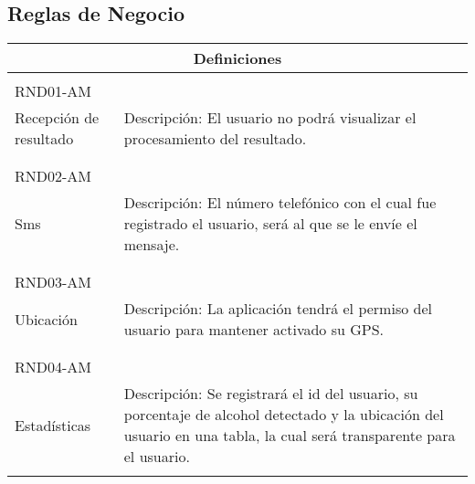 \subsection{Reglas de Negocio} 
  \begin{center}
   \begin{tabular}[b]{| p{5.5cm} | p{7cm} |}
     \hline
     \multicolumn{2}{|c|}{Definiciones} \\ \hline
    \\ RND01-AM \\ Recepción de resultado & Descripción: El usuario no podrá visualizar el procesamiento del resultado. \\ \\ \hline
    \\ RND02-AM \\ Sms & Descripción: El número telefónico con el cual fue registrado el usuario, será al que se le envíe el mensaje. \\ \\ \hline
    \\ RND03-AM \\ Ubicación & Descripción: La aplicación tendrá el permiso del usuario para mantener activado su GPS. \\ \\ \hline
    \\ RND04-AM \\ Estadísticas & Descripción: Se registrará el id del usuario, su porcentaje de alcohol detectado y la ubicación del usuario en una tabla, la cual será transparente para el usuario. \\ \\ \hline
   \end{tabular}
 \end{center}
   
